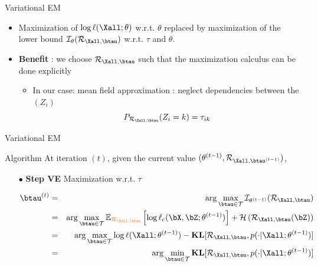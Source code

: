 \documentclass[compress,10pt]{beamer}
\begin{document}
\begin{frame}{Variational EM }

\begin{itemize}
\item Maximization of  $\log \ell(\Xall ; \theta)$  w.r.t.  $\theta$ replaced by maximization of the lower bound $\mathcal{I}_{\theta}(\mathcal{R}_{\Xall,\btau}) $  w.r.t.  $\tau$ and $\theta$. 
\item \textbf{Benefit} : we choose   $\mathcal{R}_{\Xall,\btau}$  such that the maximization calculus can be done explicitly
 \begin{itemize}
 \item In our case: mean field approximation : neglect dependencies between the  $(Z_i)$ 
 $$P_{\mathcal{R}_{\Xall,\btau}}(Z_i=k) = \tau_{ik}$$
  \end{itemize}



 \end{itemize}
  \end{frame}
\begin{frame}{Variational  EM}

\begin{block}{Algorithm}
 \noindent At iteration $(t)$, given the current value  $(\theta^{(t-1)},\mathcal{R}_{\Xall, \btau^{(t-1)}})$,
\begin{enumerate}
\item[$\bullet$]\textbf{Step VE} Maximization w.r.t. $\tau$

\begin{eqnarray*}
\btau^{(t)}  &=&  \arg \max_{\btau  \in \mathcal{T}}  \mathcal{I}_{\theta^{(t-1)}}(\mathcal{R}_{\Xall,\btau})\\
 &=&  \arg \max_{\btau  \in \mathcal{T}}   \mathbb{E}_{\color{dgreen}\mathcal{R}_{\Xall,\btau}} \left[\log \ell_c(\bX,\bZ;  \theta^{(t-1)})   \right] +  \mathcal{H}\left(\mathcal{R}_{\Xall,\btau}(\bZ)\right) \\
&=&  \arg \max_{\btau  \in \mathcal{T}}  \log \ell(\Xall ; \theta^{(t-1)})  -  \mathbf{KL}[\mathcal{R}_{\Xall, \btau}, p(\cdot | \Xall; \theta^{(t-1)})]\\ 
&=& \arg \min_{\btau  \in \mathcal{T}}\mathbf{KL}[\mathcal{R}_{\Xall, \btau}, p(\cdot | \Xall; \theta^{(t-1)})]\\ 
 \end{eqnarray*}
 \end{enumerate}

 \end{block} 
 \end{frame}
\end{document}
